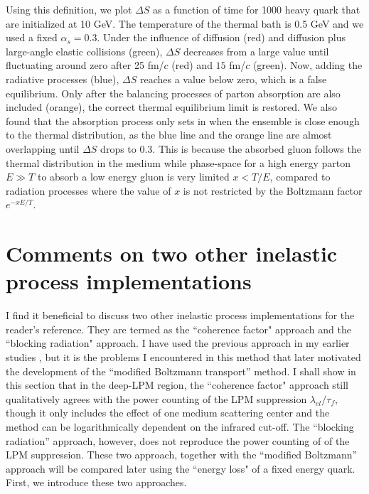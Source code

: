 Using this definition, we plot $\Delta S$ as a function of time for 1000 heavy quark that are initialized at 10 GeV.
The temperature of the thermal bath is 0.5 GeV and we used a fixed $\alpha_s = 0.3$.
Under the influence of diffusion (red) and diffusion plus large-angle elastic collisions (green), $\Delta S$ decreases from a large value until fluctuating around zero after 25 fm/$c$ (red) and $15$ fm/$c$ (green).
Now, adding the radiative processes (blue), $\Delta S$ reaches a value below zero, which is a false equilibrium.
Only after the balancing processes of parton absorption are also included (orange), the correct thermal equilibrium limit is restored. 
We also found that the absorption process only sets in when the ensemble is close enough to the thermal distribution, as the blue line and the orange line are almost overlapping until $\Delta S$ drops to 0.3.
This is because the absorbed gluon follows the thermal distribution in the medium while phase-space for a high energy parton $E\gg T$ to absorb a low energy gluon is very limited $x<T/E$, compared to radiation processes where the value of $x$ is not restricted by the Boltzmann factor $e^{-xE/T}$.

\section{Comments on two other inelastic process implementations}
I find it beneficial to discuss two other inelastic process implementations for the reader's reference. 
They are termed as the ``coherence factor" approach and the ``blocking radiation" approach.
I have used the previous approach in my earlier studies \cite{Ke:2018tsh}, but it is the problems I encountered in this method that later motivated the development of the ``modified Boltzmann transport'' method. 
I shall show in this section that in the deep-LPM region, the ``coherence factor" approach still qualitatively agrees with the power counting of the LPM suppression $\lambda_{el}/\tau_f$, though it only includes the effect of one medium scattering center and the method can be logarithmically dependent on the infrared cut-off.
The ``blocking radiation'' approach, however,  does not reproduce the power counting of of the LPM suppression.
These two approach, together with the ``modified Boltzmann'' approach will be compared later using the ``energy loss" of a fixed energy quark.
First, we introduce these two approaches.

